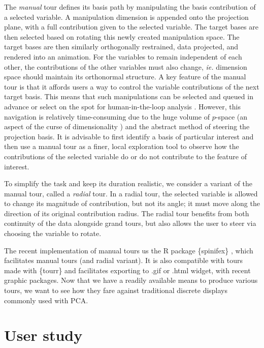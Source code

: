 \documentclass{template/monashthesis}
\begin{document}
The \emph{manual} tour \autocite{cook_manual_1997} defines its basis path by manipulating the basis contribution of a selected variable. A manipulation dimension is appended onto the projection plane, with a full contribution given to the selected variable. The target bases are then selected based on rotating this newly created manipulation space. The target bases are then similarly orthogonally restrained, data projected, and rendered into an animation. For the variables to remain independent of each other, the contributions of the other variables must also change, \emph{ie.} dimension space should maintain its orthonormal structure. A key feature of the manual tour is that it affords users a way to control the variable contributions of the next target basis. This means that such manipulations can be selected and queued in advance or select on the spot for human-in-the-loop analysis \autocite{karwowski_international_2006}. However, this navigation is relatively time-consuming due to the huge volume of \(p\)-space (an aspect of the curse of dimensionality \autocite{bellman_dynamic_1957}) and the abstract method of steering the projection basis. It is advisable to first identify a basis of particular interest and then use a manual tour as a finer, local exploration tool to observe how the contributions of the selected variable do or do not contribute to the feature of interest.

To simplify the task and keep its duration realistic, we consider a variant of the manual tour, called a \emph{radial} tour. In a radial tour, the selected variable is allowed to change its magnitude of contribution, but not its angle; it must move along the direction of its original contribution radius. The radial tour benefits from both continuity of the data alongside grand tours, but also allows the user to steer via choosing the variable to rotate.

The recent implementation of manual tours us the R package \{spinifex\} \autocite{spyrison_spinifex_2020}, which facilitates manual tours (and radial variant). It is also compatible with tours made with \{tourr\} \autocite{wickham_tourr:_2011} and facilitates exporting to .gif or .html widget, with recent graphic packages. Now that we have a readily available means to produce various tours, we want to see how they fare against traditional discrete displays commonly used with PCA.

\hypertarget{sec:userstudy}{%
\section{User study}\label{sec:userstudy}}
\end{document}
